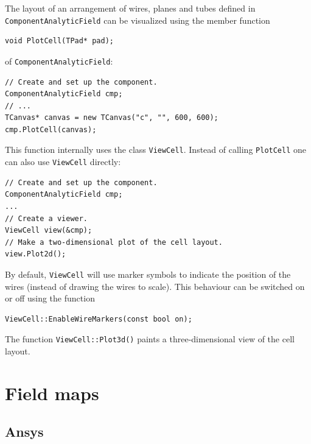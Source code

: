 
The layout of an arrangement of wires, planes and tubes
defined in \texttt{ComponentAnalyticField} can be visualized using 
the member function
\begin{lstlisting}
void PlotCell(TPad* pad);
\end{lstlisting}
of \texttt{ComponentAnalyticField}:
\begin{lstlisting}
// Create and set up the component.
ComponentAnalyticField cmp;
// ...
TCanvas* canvas = new TCanvas("c", "", 600, 600);
cmp.PlotCell(canvas); 
\end{lstlisting}
This function internally uses the class \texttt{ViewCell}.
Instead of calling \texttt{PlotCell} one can also use \texttt{ViewCell} directly:
\begin{lstlisting}
// Create and set up the component.
ComponentAnalyticField cmp;
... 
// Create a viewer.
ViewCell view(&cmp);
// Make a two-dimensional plot of the cell layout.
view.Plot2d();
\end{lstlisting}
By default, \texttt{ViewCell} will use marker symbols to indicate the position of the wires (instead of drawing the wires to scale). 
This behaviour can be switched on or off using the function
\begin{lstlisting}
ViewCell::EnableWireMarkers(const bool on);
\end{lstlisting} 
The function \texttt{ViewCell::Plot3d()} paints
a three-dimensional view of the cell layout.

\section{Field maps}

\subsection{Ansys}

